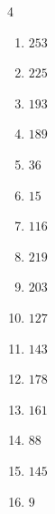 \begin{multicols}{4}
\begin{enumerate}
  \item $253$


  \item $225$


  \item $193$


  \item $189$


  \item $36$


  \item $15$


  \item $116$


  \item $219$


  \item $203$


  \item $127$


  \item $143$


  \item $178$


\columnbreak %

  \item $161$


  \item $88$


  \item $145$


  \item $9$


\end{enumerate}
\end{multicols}
